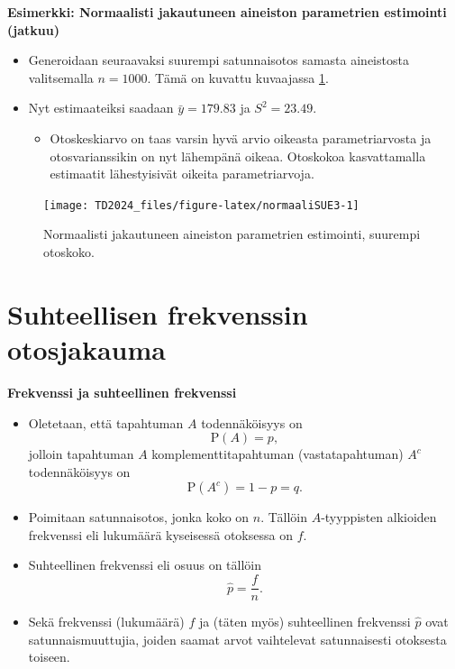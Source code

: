 \documentclass[
]{book}
\providecommand{\tightlist}{%
  \setlength{\itemsep}{0pt}\setlength{\parskip}{0pt}}
\begin{document}
\begin{eblock}{}

\textbf{Esimerkki: Normaalisti jakautuneen aineiston parametrien estimointi (jatkuu)}

\begin{itemize}
\tightlist
\item
  Generoidaan seuraavaksi suurempi satunnaisotos samasta aineistosta valitsemalla \(n=1000\). Tämä on kuvattu kuvaajassa \ref{fig:normaaliSUE3}.\\
\item
  Nyt estimaateiksi saadaan \(\bar{y} = 179.83\) ja \(S^2 = 23.49\).

  \begin{itemize}
  \tightlist
  \item
    Otoskeskiarvo on taas varsin hyvä arvio oikeasta parametriarvosta ja otosvarianssikin on nyt lähempänä oikeaa. Otoskokoa kasvattamalla estimaatit lähestyisivät oikeita parametriarvoja.
  \end{itemize}
\end{itemize}

\end{eblock}

\begin{figure}

{\centering \texttt{[image: TD2024\_files/figure-latex/normaaliSUE3-1]} 

}

\caption{Normaalisti jakautuneen aineiston parametrien estimointi, suurempi otoskoko.}\label{fig:normaaliSUE3}
\end{figure}

\hfill\break

\hypertarget{alaluku85}{%
\section{Suhteellisen frekvenssin otosjakauma}\label{alaluku85}}

\textbf{Frekvenssi ja suhteellinen frekvenssi}

\begin{itemize}
\item
  Oletetaan, että tapahtuman \(A\) todennäköisyys on
  \[
  \text{P}(A) = p,
  \]
  jolloin tapahtuman \(A\) komplementtitapahtuman (vastatapahtuman) \(A^c\) todennäköisyys on
  \[
  \text{P}(A^c) = 1- p = q.
  \]
\item
  Poimitaan satunnaisotos, jonka koko on \(n\). Tällöin \(A\)-tyyppisten alkioiden frekvenssi eli lukumäärä kyseisessä otoksessa on \(f\).
\item
  Suhteellinen frekvenssi eli osuus on tällöin
  \[
  \widehat{p} = \frac{f}{n}.
  \]
\item
  Sekä frekvenssi (lukumäärä) \(f\) ja (täten myös) suhteellinen frekvenssi \(\widehat{p}\) ovat satunnaismuuttujia, joiden saamat arvot vaihtelevat satunnaisesti otoksesta toiseen.
\end{itemize}
\end{document}

